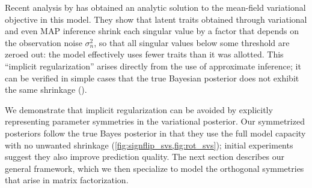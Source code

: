 \documentclass{article}
\renewcommand{\v}[1]{\mathbf{#1}}
\begin{document}

Recent analysis by \citet{nakajima2013global} has obtained an analytic
solution to the mean-field variational objective in this model. They show
that latent traits obtained through variational and even MAP inference shrink each singular value by
a factor that depends on the observation noise $\sigma^2_n$, so that
all singular values below some threshold are zeroed out: the
model effectively uses fewer traits than it was allotted.  This
``implicit regularization'' arises directly from the use of
approximate inference; it can be verified  in simple cases that the
true Bayesian posterior does not exhibit the same shrinkage
(). 

We demonstrate that implicit regularization can be avoided by explicitly representing parameter
symmetries in the variational posterior. Our symmetrized posteriors
follow the true Bayes posterior in that they use the full model capacity with no unwanted shrinkage
(\cref{fig:signflip_svs,fig:rot_svs}); initial experiments suggest they
also improve prediction quality. The next section describes our
general framework, which we then specialize to model the orthogonal symmetries that arise in matrix factorization. 
\end{document}
